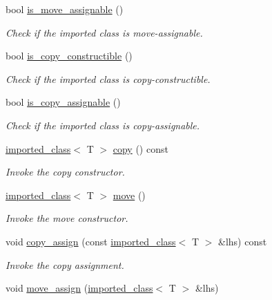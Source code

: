 \begin{DoxyCompactItemize}
\mbox{\label{a01664_ac0c08ef84b2659240001af9f346e7d85}} 
bool \hyperlink{a01664_ac0c08ef84b2659240001af9f346e7d85}{is\+\_\+move\+\_\+assignable} ()
\begin{DoxyCompactList}\small\item\em Check if the imported class is move-\/assignable. \end{DoxyCompactList}\item 
\mbox{\label{a01664_a8a6beccfbcee584e8cc4c6ee1989e4ce}} 
bool \hyperlink{a01664_a8a6beccfbcee584e8cc4c6ee1989e4ce}{is\+\_\+copy\+\_\+constructible} ()
\begin{DoxyCompactList}\small\item\em Check if the imported class is copy-\/constructible. \end{DoxyCompactList}\item 
\mbox{\label{a01664_a00a39e705beafb32b8e37d704437e251}} 
bool \hyperlink{a01664_a00a39e705beafb32b8e37d704437e251}{is\+\_\+copy\+\_\+assignable} ()
\begin{DoxyCompactList}\small\item\em Check if the imported class is copy-\/assignable. \end{DoxyCompactList}\item 
\hyperlink{a01664}{imported\+\_\+class}$<$ T $>$ \hyperlink{a01664_a382c085143f6c91b0d0a52dd1cb7851a}{copy} () const
\begin{DoxyCompactList}\small\item\em Invoke the copy constructor. \end{DoxyCompactList}\item 
\hyperlink{a01664}{imported\+\_\+class}$<$ T $>$ \hyperlink{a01664_a081d37ced4c6ac2b130d353dac432854}{move} ()
\begin{DoxyCompactList}\small\item\em Invoke the move constructor. \end{DoxyCompactList}\item 
void \hyperlink{a01664_aabf3d4c96c020a756b73db59dfbf46ba}{copy\+\_\+assign} (const \hyperlink{a01664}{imported\+\_\+class}$<$ T $>$ \&lhs) const
\begin{DoxyCompactList}\small\item\em Invoke the copy assignment. \end{DoxyCompactList}\item 
void \hyperlink{a01664_a0e6112cf988cbe0a2b05e0d5dc874a66}{move\+\_\+assign} (\hyperlink{a01664}{imported\+\_\+class}$<$ T $>$ \&lhs)

\end{DoxyCompactItemize}
